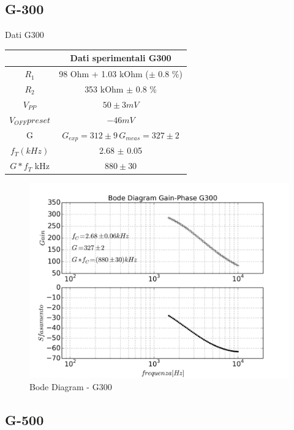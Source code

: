 \documentclass{beamer}
\begin{document}
\subsection{G-300}

\begin{frame}{Dati G300}

{
\centering
\begin{tabular}{|c|c|}
\hline  &  \textbf{Dati sperimentali G300} \\ 
\hline $R_1$  &  98 \si{Ohm} + 1.03 \si{kOhm} ($\pm$ 0.8 \%) \\ 
\hline $R_2$ & 353 \si{kOhm} $\pm$ 0.8 \%  \\ 
\hline $V_{PP}$ & $50  \pm 3 \si{mV} $ \\ 
\hline $V_{OFF} preset$ & $ -46  \si{mV} $ \\
\hline G &  $G_{exp}  = 312 \pm 9  \, G_{meas} = 327 \pm 2 $ \\ 
\hline $f_T (kHz)$ &  2.68 $\pm$ 0.05 \\
\hline $G*f_{T}$ \si{kHz} & $ 880 \pm 30 $\\
\hline
\end{tabular}
 
}

\end{frame}

\begin{frame}
\begin{figure}
\centering
\includegraphics[width=0.9\linewidth]{./es_9_bode_g300}
\caption{Bode Diagram - G300}
\label{fig:es_9_bode_g300}
\end{figure}
\end{frame}


\subsection{G-500}
\end{document}
